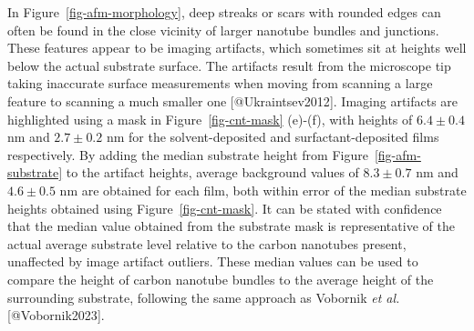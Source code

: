 \documentclass[
  letterpaper,
  DIV=11,
  numbers=noendperiod]{scrartcl}
\begin{document}
In Figure~\ref{fig-afm-morphology}, deep streaks or scars with rounded
edges can often be found in the close vicinity of larger nanotube
bundles and junctions. These features appear to be imaging artifacts,
which sometimes sit at heights well below the actual substrate surface.
The artifacts result from the microscope tip taking inaccurate surface
measurements when moving from scanning a large feature to scanning a
much smaller one {[}@Ukraintsev2012{]}. Imaging artifacts are
highlighted using a mask in Figure~\ref{fig-cnt-mask} (e)-(f), with
heights of \(6.4 \pm 0.4\) nm and \(2.7 \pm 0.2\) nm for the
solvent-deposited and surfactant-deposited films respectively. By adding
the median substrate height from Figure~\ref{fig-afm-substrate} to the
artifact heights, average background values of \(8.3 \pm 0.7\) nm and
\(4.6 \pm 0.5\) nm are obtained for each film, both within error of the
median substrate heights obtained using Figure~\ref{fig-cnt-mask}. It
can be stated with confidence that the median value obtained from the
substrate mask is representative of the actual average substrate level
relative to the carbon nanotubes present, unaffected by image artifact
outliers. These median values can be used to compare the height of
carbon nanotube bundles to the average height of the surrounding
substrate, following the same approach as Vobornik \emph{et al.}
{[}@Vobornik2023{]}.
\end{document}
